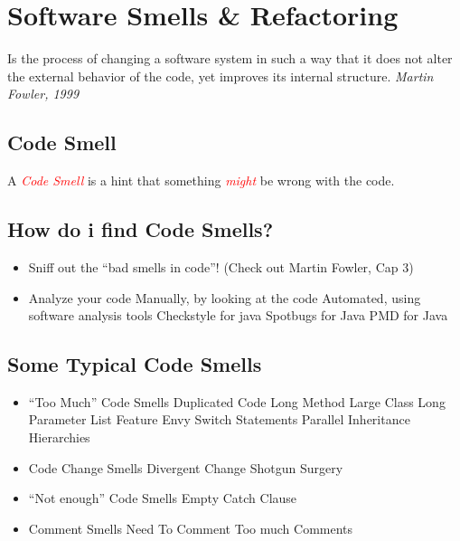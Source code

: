 \documentclass[10pt]{article}
\begin{document}
	
	\section{Software Smells \& Refactoring }
	Is the process of changing a software system in such a way that
	it does not alter the external behavior of the code, yet improves
	its internal structure. \textit{Martin Fowler, 1999}
	
	\subsection{Code Smell}
	A \textcolor{red}{\textit{Code Smell}} is a hint that something \textcolor{red}{\textit{might}} be wrong with the code.
	\subsection{How do i find Code Smells?}
	\begin{itemize}
		\item Sniff out the “bad smells in code”! (Check out Martin Fowler, Cap 3)
		\item 	Analyze your code
			\subitem Manually, by looking at the code
			\subitem Automated, using software analysis tools
				\subsubitem Checkstyle for java 
				\subsubitem Spotbugs for Java
				\subsubitem PMD for Java
	\end{itemize}
	
	\subsection{Some Typical Code Smells}
	\begin{multicols}{2}
	\begin{itemize}
		\item “Too Much” Code Smells Duplicated Code
			\subitem Long Method
			\subitem Large Class
			\subitem Long Parameter List
			\subitem Feature Envy
			\subitem Switch Statements
			\subitem Parallel Inheritance Hierarchies \\
		\item Code Change Smells
			\subitem Divergent Change
			\subitem Shotgun Surgery
			\item “Not enough” Code Smells
			\subitem Empty Catch Clause 
		\item Comment Smells
			\subitem Need To Comment 
			\subitem Too much Comments
	\end{itemize}	
	\end{multicols}
\end{document}
